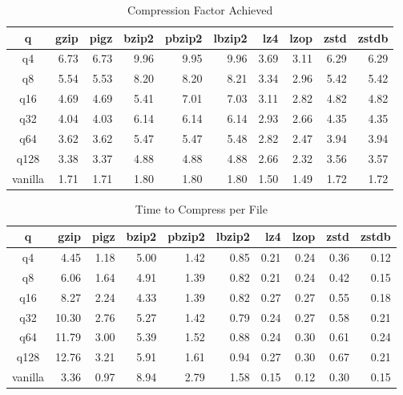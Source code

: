 \begin{table}
\caption{Compression Factor Achieved}
\centering
\begin{tabular}[]{crrrrrrrrr}
\hline
 q        &  gzip & pigz & bzip2 & pbzip2 & lbzip2 & lz4 & lzop & zstd & zstdb  \\
\hline
 q4       &   6.73 &  6.73 &  9.96 &  9.95 &  9.96 &  3.69 &  3.11 &  6.29 &  6.29  \\
 q8       &   5.54 &  5.53 &  8.20 &  8.20 &  8.21 &  3.34 &  2.96 &  5.42 &  5.42  \\
 q16      &   4.69 &  4.69 &  5.41 &  7.01 &  7.03 &  3.11 &  2.82 &  4.82 &  4.82  \\
 q32      &   4.04 &  4.03 &  6.14 &  6.14 &  6.14 &  2.93 &  2.66 &  4.35 &  4.35  \\
 q64      &   3.62 &  3.62 &  5.47 &  5.47 &  5.48 &  2.82 &  2.47 &  3.94 &  3.94  \\
 q128     &   3.38 &  3.37 &  4.88 &  4.88 &  4.88 &  2.66 &  2.32 &  3.56 &  3.57  \\
 vanilla  &   1.71 &  1.71 &  1.80 &  1.80 &  1.80 &  1.50 &  1.49 &  1.72 &  1.72  \\
\hline
\end{tabular}
\label{compress_factor}
\end{table}


\begin{table}
\caption{Time to Compress per File}
\centering
\begin{tabular}[]{crrrrrrrrr}
\hline
 q        &  gzip & pigz & bzip2 & pbzip2 & lbzip2 & lz4 & lzop & zstd & zstdb  \\
\hline
 q4       &    4.45 &   1.18 &   5.00 &   1.42 &   0.85 &   0.21 &   0.24 &   0.36 &   0.12  \\
 q8       &    6.06 &   1.64 &   4.91 &   1.39 &   0.82 &   0.21 &   0.24 &   0.42 &   0.15  \\
 q16      &    8.27 &   2.24 &   4.33 &   1.39 &   0.82 &   0.27 &   0.27 &   0.55 &   0.18  \\
 q32      &   10.30 &   2.76 &   5.27 &   1.42 &   0.79 &   0.24 &   0.27 &   0.58 &   0.21  \\
 q64      &   11.79 &   3.00 &   5.39 &   1.52 &   0.88 &   0.24 &   0.30 &   0.61 &   0.24  \\
 q128     &   12.76 &   3.21 &   5.91 &   1.61 &   0.94 &   0.27 &   0.30 &   0.67 &   0.21  \\
 vanilla  &    3.36 &   0.97 &   8.94 &   2.79 &   1.58 &   0.15 &   0.12 &   0.30 &   0.15  \\
\hline
\end{tabular}
\label{timing_compress}
\end{table}

